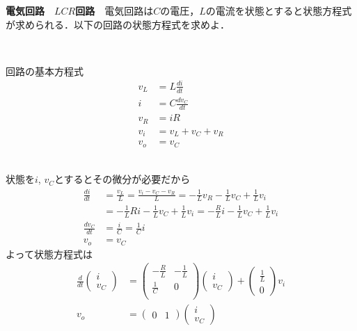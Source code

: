 \documentclass[a4paper,11pt]{jreport}
\begin{document}
\newpage

\noindent
{\bf 電気回路　$LCR$回路}　電気回路は$C$の電圧，$L$の電流を状態とすると状態方程式が求められる．以下の回路の状態方程式を求めよ．

\begin{minipage}{100mm}
\end{minipage}
\begin{minipage}{50mm}
回路の基本方程式
\begin{align*}
	v_L & = L \frac{d i}{dt} \\
	i & = C \frac{d v_C}{dt} \\
	v_R &= i R \\
	v_i & = v_L + v_C + v_R \\
	v_o & = v_C
\end{align*}
\end{minipage}
\ \\[1cm]

状態を$i$, $v_C$とするとその微分が必要だから
\begin{align*}
	\frac{d i}{dt} 
	&= \frac{v_L}{L} 
	= \frac{v_i - v_C - v_R}{L} 
	= - \frac{1}{L} v_R - \frac{1}{L} v_C + \frac{1}{L} v_i 
\\ &
	= - \frac{1}{L} R i - \frac{1}{L} v_C + \frac{1}{L} v_i 
	= - \frac{R}{L} i - \frac{1}{L} v_C + \frac{1}{L} v_i \\
	\frac{d v_C}{dt}
	&= \frac{i}{C} 
	= \frac{1}{C} i \\
	v_o &= v_C 
\end{align*}
よって状態方程式は
\begin{align*}
	\frac{d}{dt}
	\left (
	\begin{array}{c}
		i \\
		v_C
	\end{array}
	\right )
	&=
	\left (
	\begin{array}{cc}
		-\frac{R}{L} & -\frac{1}{L} \\
		\frac{1}{C} & 0 \\
	\end{array}
	\right )
	\left (
	\begin{array}{c}
		i \\
		v_C
	\end{array}
	\right )
	+
	\left (
	\begin{array}{c}
		\frac{1}{L} \\
		0
	\end{array}
	\right )
	v_i
\\
	v_o 
	&=
	\left (
	\begin{array}{cc}
		0 & 1 
	\end{array}
	\right )
	\left (
	\begin{array}{c}
		i \\
		v_C
	\end{array}
	\right )
\end{align*}
\end{document}
